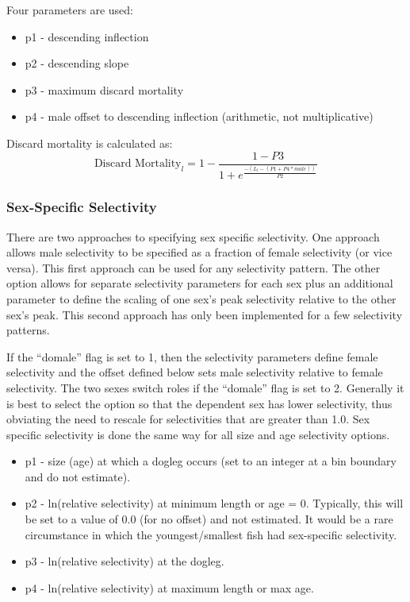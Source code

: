 Four parameters are used:
\begin{itemize}
	\item p1 - descending inflection
	\item p2 - descending slope
	\item p3 - maximum discard mortality
	\item p4 - male offset to descending inflection (arithmetic, not multiplicative)
\end{itemize}

Discard mortality is calculated as:
\begin{equation}
	\text{Discard Mortality}_l = 1 - \frac{1-P3}{1+e^{\frac{-(L_l-(P1+P4*male))}{P2}}}
\end{equation}

\subsubsection{Sex-Specific Selectivity}
There are two approaches to specifying sex specific selectivity. One approach allows male selectivity to be specified as a fraction of female selectivity (or vice versa). This first approach can be used for any selectivity pattern. The other option allows for separate selectivity parameters for each sex plus an additional parameter to define the scaling of one sex's peak selectivity relative to the other sex's peak. This second approach has only been implemented for a few selectivity patterns.

If the ``domale'' flag is set to 1, then the selectivity parameters define female selectivity and the offset defined below sets male selectivity relative to female selectivity. The two sexes switch roles if the ``domale'' flag is set to 2. Generally it is best to select the option so that the dependent sex has lower selectivity, thus obviating the need to rescale for selectivities that are greater than 1.0. Sex specific selectivity is done the same way for all size and age selectivity options.
\begin{itemize}
	\item p1 - size (age) at which a dogleg occurs (set to an integer at a bin boundary and do not estimate).
	\item p2 - ln(relative selectivity) at minimum length or age = 0. Typically, this will be set to a value of 0.0 (for no offset) and not estimated. It would be a rare circumstance in which the youngest/smallest fish had sex-specific selectivity.
	\item p3 - ln(relative selectivity) at the dogleg.
	\item p4 - ln(relative selectivity) at maximum length or max age.
\end{itemize}

